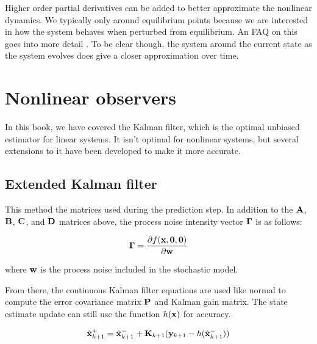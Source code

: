 Higher order partial derivatives can be added to better approximate the
nonlinear dynamics. We typically only  around
equilibrium points because we are interested in how the \gls{system} behaves
when perturbed from equilibrium. An FAQ on this goes into more detail
\cite{bib:linearize_equilibrium_point}. To be clear though,
 the \gls{system} around the current
\gls{state} as the \gls{system} evolves does give a closer approximation over
time.

\section{Nonlinear observers}

In this book, we have covered the Kalman filter, which is the optimal unbiased
estimator for linear \glspl{system}. It isn't optimal for nonlinear
\glspl{system}, but several extensions to it have been developed to make it more
accurate.

\subsection{Extended Kalman filter}

This method  the matrices used during the
prediction step. In addition to the $\mathbf{A}$, $\mathbf{B}$, $\mathbf{C}$, and
$\mathbf{D}$ matrices above, the process noise intensity vector $\mathbf{\Gamma}$ is
 as follows:

\begin{equation*}
  \mathbf{\Gamma} = \frac{\partial f(\mathbf{x}, \mathbf{0}, \mathbf{0})}{\partial \mathbf{w}}
\end{equation*}

where $\mathbf{w}$ is the process noise included in the stochastic model.

From there, the continuous Kalman filter equations are used like normal to
compute the error covariance matrix $\mathbf{P}$ and Kalman gain matrix. The
\gls{state} estimate update can still use the function $h(\mathbf{x})$ for
accuracy.

\begin{equation*}
  \hat{\mathbf{x}}_{k+1}^+ = \hat{\mathbf{x}}_{k+1}^- +
    \mathbf{K}_{k+1}(\mathbf{y}_{k+1} - h(\hat{\mathbf{x}}_{k+1}^-))
\end{equation*}

